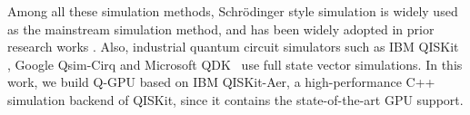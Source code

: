 \begin{sloppypar}
Among all these simulation methods, Schr\"odinger style simulation is widely used as the mainstream simulation method, and has been widely adopted in prior research works \cite{10.1145/3126908.3126947, 10.1145/3295500.3356155,10.48550/arXiv.1910.09534,10.48550/arXiv.1710.05867,10.48550/arXiv.1601.07195,10.48550/arXiv.1804.04797,10.1109/HPCA51647.2021.00026,zotero-3528,10.1145/3310273.3323053,10.1016/j.cpc.2006.08.007}.
Also, industrial quantum circuit simulators such as IBM QISKit \cite{10.5281/zenodo.2562111}, Google Qsim-Cirq \cite{10.48550/arXiv.1601.07195,10.1145/3126908.3126947} and Microsoft QDK~\cite{msqdk} 
use full state vector simulations. 
In this work, we build Q-GPU based on IBM QISKit-Aer, a high-performance C++ simulation backend of QISKit, since it contains the state-of-the-art GPU support.
\end{sloppypar}

